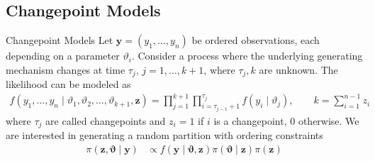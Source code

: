 \subsection{Changepoint Models}
\begin{frame}{Changepoint Models}
    Let $\bm{y}=(y_{1},\ldots,y_{n})$ be \alert{ordered} observations, each depending on a parameter $\vartheta_{i}$.
    Consider a process where the underlying generating mechanism changes at time $\tau_{j}$, $j=1,\ldots,k+1$, where $\tau_{j},k$ are unknown. The likelihood can be modeled as
    \begin{align*}
        f(y_{1},\ldots,y_{n} \mid \vartheta_1, \vartheta_2, \ldots, \vartheta_{k+1}, \bm{z})=\prod_{j=1}^{k+1} \prod_{i=\tau_{j-1}+1}^{\tau_j} f(y_i \mid \vartheta_j),
        \qquad
        k=\sum_{i=1}^{n-1} z_i
    \end{align*}
    where $\tau_j$ are called \alert{changepoints} and $z_{i} = 1$ if $i$ is a changepoint, $0$ otherwise.
    We are interested in \alert{generating a random partition with ordering constraints}
    \begin{align*}
        \pi(\bm{z}, \bm{\vartheta} \mid \bm{y}) & \propto f(\bm{y} \mid \bm{\vartheta}, \bm{z}) \pi(\bm{\vartheta} \mid \bm{z}) \pi(\bm{z})
    \end{align*}
\end{frame}


